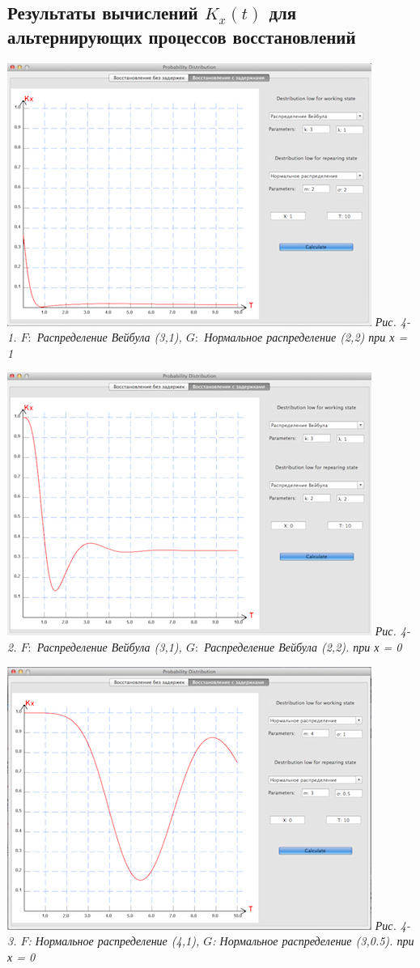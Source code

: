 \begin{center}
\item\subsection{Результаты вычислений $K_x(t)$ для альтернирующих процессов восстановлений}
\end{center}

\includegraphics{4-1.png} 
\textit{Рис. 4-1. $F:$ Распределение Вейбула (3,1), $G:$ Нормальное распределение (2,2) при х = 1}

\includegraphics{4-2.png} 
\textit{Рис. 4-2. $F:$ Распределение Вейбула (3,1), $G:$ Распределение Вейбула (2,2). при х  = 0}

\includegraphics{4-3.png} 
\textit{Рис. 4-3. $F$:  Нормальное распределение (4,1), $G$:  Нормальное распределение (3,0.5). при х  = 0}

